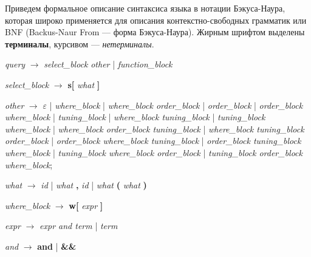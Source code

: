 Приведем формальное описание синтаксиса языка в нотации Бэкуса-Наура, %
которая широко применяется для описания контекстно-свободных грамматик или BNF 
(Backus-Naur From --- форма Бэкуса-Наура). Жирным шрифтом выделены {\bf терминалы}, 
курсивом --- {\it нетерминалы}. 

{\it query} $\to$ {\it select\_block} {\it other} | {\it function\_block}

{\it select\_block} $\to$ {\bf s[} {\it what} {\bf ]}

{\it other} $\to$ $\varepsilon$ | {\it where\_block} | {\it where\_block order\_block}
    | {\it order\_block} | {\it order\_block where\_block}
    | {\it tuning\_block} | {\it where\_block tuning\_block} | {\it tuning\_block where\_block} 
    | {\it where\_block order\_block tuning\_block} | {\it where\_block tuning\_block order\_block} 
    | {\it order\_block where\_block tuning\_block} | {\it order\_block tuning\_block where\_block}
    | {\it tuning\_block where\_block order\_block} | {\it tuning\_block order\_block where\_block};

{\it what} $\to$ {\it id} | {\it what} {\bf ,} {\it id} | {\it what} {\bf (} {\it what} {\bf )}

{\it where\_block} $\to$ {\bf w[} {\it expr} {\bf ]}

{\it expr} $\to$ {\it expr and term} | {\it term}

{\it and} $\to$ {\bf and} | {\bf \&\&}  

